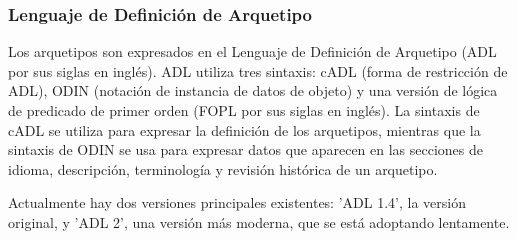 \subsubsection{Lenguaje de Definición de Arquetipo}

Los arquetipos son expresados en el Lenguaje de Definición de Arquetipo \cite{openEHRADL} (ADL por sus siglas en inglés). ADL utiliza tres sintaxis: cADL (forma de restricción de ADL), ODIN (notación de instancia de datos de objeto) y una versión de lógica de predicado de primer orden (FOPL por sus siglas en inglés). La sintaxis de cADL se utiliza para expresar la definición de los arquetipos, mientras que la sintaxis de ODIN se usa para expresar datos que aparecen en las secciones de idioma, descripción, terminología y revisión histórica de un arquetipo.

Actualmente hay dos versiones principales existentes: 'ADL 1.4', la versión original, y 'ADL 2', una versión más moderna, que se está adoptando lentamente.
